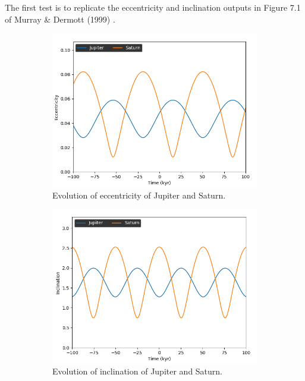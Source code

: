 \documentclass[11pt, oneside]{article}   	%
\begin{document}
The first test is to replicate the eccentricity and inclination outputs in Figure 7.1 of Murray \& Dermott (1999) \cite{ssd}.
\begin{figure}[!h]
    \centering
    \begin{subfigure}[t]{0.49\textwidth}
    \captionsetup{width=0.9\textwidth}
	\centering
       	 \includegraphics[width=\textwidth]{JS_ecc.png}
       	 \caption{Evolution of eccentricity of Jupiter and Saturn.}
        	\label{}
    \end{subfigure}
    \begin{subfigure}[t]{0.49\textwidth}
    \captionsetup{width=0.9\textwidth}
        	\centering
	\includegraphics[width=\textwidth]{JS_inc.png}
        	\caption{Evolution of inclination of Jupiter and Saturn.}
        	\label{}
    \end{subfigure}
    \caption{}
    \label{JSout}
\end{figure}
\end{document}
